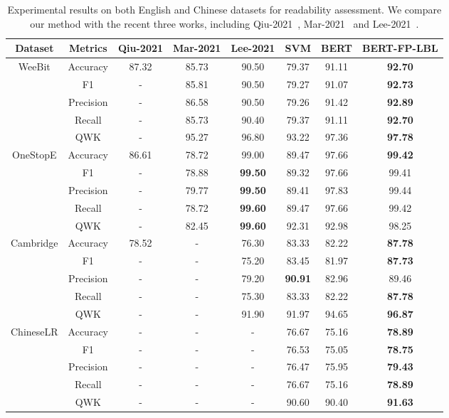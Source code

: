 \documentclass[11pt]{article}
\begin{document}
\begin{table*}[htbp]
\centering
\small
\begin{tabular}{ccccc|ccc}
\hline
\textbf{Dataset} & \textbf{Metrics} & 
\textbf{Qiu-2021} & \textbf{Mar-2021} & \textbf{Lee-2021} & 
\textbf{SVM} & \textbf{BERT} & \textbf{BERT-FP-LBL} \\
\hline
\multirow{5}{*}{WeeBit}
& Accuracy & 87.32 & 85.73 & 90.50 & 79.37 & 91.11 & \textbf{92.70} \\
& F1    & -   & 85.81 & 90.50 & 79.27 & 91.07 & \textbf{92.73} \\
& Precision & -   & 86.58 & 90.50 & 79.26 & 91.42 & \textbf{92.89} \\
& Recall  & -   & 85.73 & 90.40 & 79.37 & 91.11 & \textbf{92.70} \\
& QWK    & -   & 95.27 & 96.80 & 93.22 & 97.36 & \textbf{97.78} \\
\hline
\multirow{5}{*}{OneStopE}
& Accuracy & 86.61 & 78.72 &     99.00 & 89.47 & 97.66 & \textbf{99.42} \\
& F1    & -   & 78.88 & \textbf{99.50} & 89.32 & 97.66 & 99.41 \\
& Precision & -   & 79.77 & \textbf{99.50} & 89.41 & 97.83 & 99.44 \\
& Recall  & -   & 78.72 & \textbf{99.60} & 89.47 & 97.66 & 99.42 \\
& QWK    & -   & 82.45 & \textbf{99.60} & 92.31 & 92.98 & 98.25 \\
\hline
\multirow{5}{*}{Cambridge}
& Accuracy & 78.52 & -   & 76.30 & 83.33 & 82.22 & \textbf{87.78} \\
& F1    & -   & -   & 75.20 & 83.45 & 81.97 & \textbf{87.73} \\
& Precision & -   & -   & 79.20 & \textbf{90.91} & 82.96 & 89.46 \\
& Recall  & -   & -   & 75.30 & 83.33 & 82.22 & \textbf{87.78} \\
& QWK    & -   & -   & 91.90 & 91.97 & 94.65 & \textbf{96.87} \\
\hline
\hline
\multirow{5}{*}{ChineseLR}
& Accuracy & -   & -   & -   & 76.67 & 75.16 & \textbf{78.89} \\
& F1    & -   & -   & -   & 76.53 & 75.05 & \textbf{78.75} \\
& Precision & -   & -   & -   & 76.47 & 75.95 & \textbf{79.43} \\
& Recall  & -   & -   & -   & 76.67 & 75.16 & \textbf{78.89} \\
& QWK    & -   & -   & -   & 90.60 & 90.40 & \textbf{91.63} \\
\hline
\end{tabular}
\caption{Experimental results on both English and Chinese datasets for readability assessment. We compare our method with the recent three works, including Qiu-2021~\cite{qiu2021learning}, Mar-2021~\cite{martinc2021supervised} and Lee-2021~\cite{lee2021pushing}.}
\end{table*}
\end{document}
